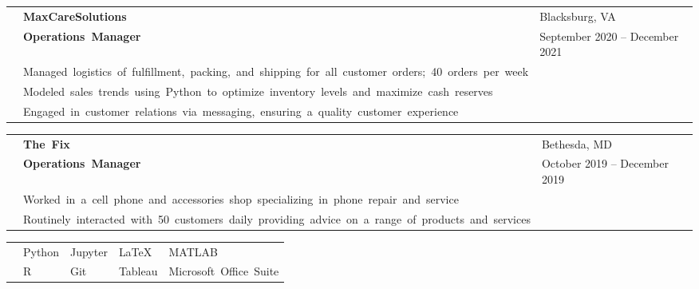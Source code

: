 \documentclass[12pt, letter]{book}
\begin{document}
\noindent
\begin{tabular}{@{}>{\raggedright\arraybackslash}p{3.5cm}@{}p{5cm}@{}>{\raggedleft\arraybackslash}p{10.5cm}@{}}
    & \textbf{\footnotesize\mbox{MaxCareSolutions }} & {\footnotesize {Blacksburg, VA}} \\
    & \textbf{\footnotesize\mbox{Operations Manager}} & {\footnotesize {September 2020 – December 2021}} \\
    & {\footnotesize\mbox{Managed logistics of fulfillment, packing, and shipping for all customer orders; 40 orders per week}} \\
    & {\footnotesize\mbox{Modeled sales trends using Python to optimize inventory levels and maximize cash reserves}} \\
    & {\footnotesize\mbox{Engaged in customer relations via messaging, ensuring a quality customer experience}}
\end{tabular}

\vspace{4mm}

\noindent
\begin{tabular}{@{}>{\raggedright\arraybackslash}p{3.5cm}@{}p{5cm}@{}>{\raggedleft\arraybackslash}p{10.5cm}@{}}
    & \textbf{\footnotesize\mbox{The Fix }} & {\footnotesize {Bethesda, MD}} \\
    & \textbf{\footnotesize\mbox{Operations Manager}} & {\footnotesize {October 2019 – December 2019}} \\
    & {\footnotesize\mbox{Worked in a cell phone and accessories shop specializing in phone repair and service}} \\
    & {\footnotesize\mbox{Routinely interacted with 50 customers daily providing advice on a range of products and services}}
\end{tabular}

\vspace{10mm}


\noindent
\begin{tabular}{@{}>{\raggedright\arraybackslash}p{3.5cm}@{}p{3cm}p{3cm}p{3cm}p{3cm}@{}}
    {\footnotesize{TECHNICAL}} & {\footnotesize{Python}} & {\footnotesize{Jupyter}} & {\footnotesize{\LaTeX}} & {\footnotesize{MATLAB}} \\
    {\footnotesize{SKILLS}} & {\footnotesize{R}} & {\footnotesize{Git}} & {\footnotesize{Tableau}} & \footnotesize\mbox{{Microsoft Office Suite}} \\
\end{tabular}
\end{document}
